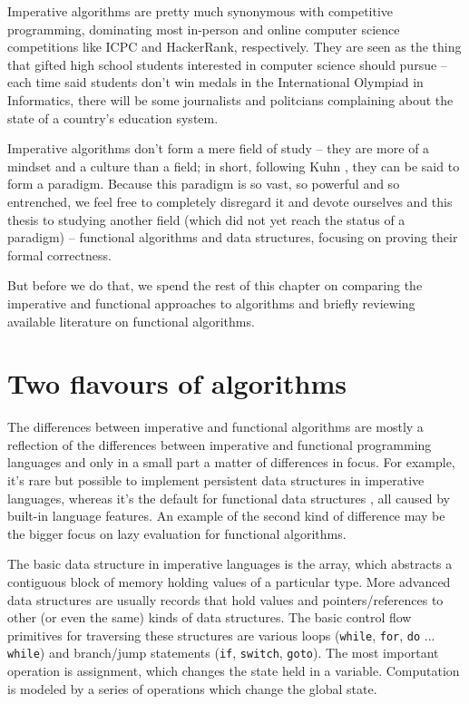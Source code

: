 \documentclass[declaration,mgr,english,shortabstract]{iithesis}
\newcommand{\m}[1]{\texttt{#1}}
\begin{document}
Imperative algorithms are pretty much synonymous with competitive programming, dominating most in-person and online computer science competitions like ICPC and HackerRank, respectively. They are seen as the thing that gifted high school students interested in computer science should pursue -- each time said students don't win medals in the International Olympiad in Informatics, there will be some journalists and politcians complaining about the state of a country's education system.

Imperative algorithms don't form a mere field of study -- they are more of a mindset and a culture than a field; in short, following Kuhn \cite{Kuhn}, they can be said to form a paradigm. Because this paradigm is so vast, so powerful and so entrenched, we feel free to completely disregard it and devote ourselves and this thesis to studying another field (which did not yet reach the status of a paradigm) -- functional algorithms and data structures, focusing on proving their formal correctness.

But before we do that, we spend the rest of this chapter on comparing the imperative and functional approaches to algorithms and briefly reviewing available literature on functional algorithms.

\section{Two flavours of algorithms}

The differences between imperative and functional algorithms are mostly a reflection of the differences between imperative and functional programming languages and only in a small part a matter of differences in focus. For example, it's rare but possible to implement persistent data structures in imperative languages, whereas it's the default for functional data structures \cite{PersistentDataStructures}, all caused by built-in language features. An example of the second kind of difference may be the bigger focus on lazy evaluation for functional algorithms.

The basic data structure in imperative languages is the array, which abstracts a contiguous block of memory holding values of a particular type. More advanced data structures are usually records that hold values and pointers/references to other (or even the same) kinds of data structures. The basic control flow primitives for traversing these structures are various loops (\m{while}, \m{for}, \m{do} ... \m{while}) and branch/jump statements (\m{if}, \m{switch}, \m{goto}). The most important operation is assignment, which changes the state held in a variable. Computation is modeled by a series of operations which change the global state.
\end{document}
